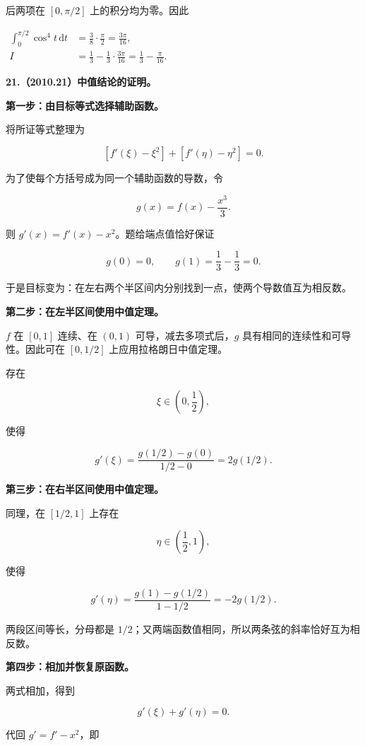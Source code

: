 \documentclass[UTF8,11pt,fontset=windows]{ctexart}
\begin{document}
后两项在 $[0,\pi/2]$ 上的积分均为零。因此

$
\begin{aligned}
\int_0^{\pi/2}\cos^4t\,\mathrm dt
&=\frac38\cdot\frac\pi2=\frac{3\pi}{16},\\[3pt]
I&=\frac13-\frac13\cdot\frac{3\pi}{16}
=\boxed{\frac13-\frac\pi{16}}.
\end{aligned}
$

\clearpage

\textbf{21.（2010.21）中值结论的证明。}

\textbf{第一步：由目标等式选择辅助函数。}

将所证等式整理为

$$
[f'(\xi)-\xi^2]+[f'(\eta)-\eta^2]=0.
$$

为了使每个方括号成为同一个辅助函数的导数，令

$$
g(x)=f(x)-\frac{x^3}{3}.
$$

则 $g'(x)=f'(x)-x^2$。题给端点值恰好保证

$$
g(0)=0,\qquad g(1)=\frac13-\frac13=0.
$$

于是目标变为：在左右两个半区间内分别找到一点，使两个导数值互为相反数。

\textbf{第二步：在左半区间使用中值定理。}

$f$ 在 $[0,1]$ 连续、在 $(0,1)$ 可导，减去多项式后，$g$ 具有相同的连续性和可导性。因此可在 $[0,1/2]$ 上应用拉格朗日中值定理。

存在

$$
\xi\in\left(0,\frac12\right),
$$

使得

$$
g'(\xi)=\frac{g(1/2)-g(0)}{1/2-0}=2g(1/2).
$$

\textbf{第三步：在右半区间使用中值定理。}

同理，在 $[1/2,1]$ 上存在

$$
\eta\in\left(\frac12,1\right),
$$

使得

$$
g'(\eta)=\frac{g(1)-g(1/2)}{1-1/2}=-2g(1/2).
$$

两段区间等长，分母都是 $1/2$；又两端函数值相同，所以两条弦的斜率恰好互为相反数。

\textbf{第四步：相加并恢复原函数。}

两式相加，得到

$$
g'(\xi)+g'(\eta)=0.
$$

代回 $g'=f'-x^2$，即
\end{document}
